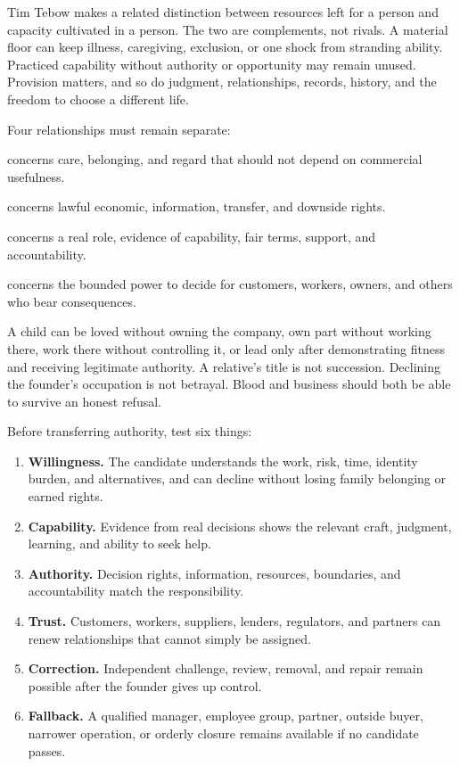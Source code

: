 Tim Tebow makes a related distinction between resources left for a person and
capacity cultivated in a person. The two are complements, not rivals. A
material floor can keep illness, caregiving, exclusion, or one shock from
stranding ability. Practiced capability without authority or opportunity may
remain unused. Provision matters, and so do judgment, relationships, records,
history, and the freedom to choose a different life.

Four relationships must remain separate:

\begin{description}[leftmargin=0em,style=unboxed,itemsep=0.1em,
  topsep=0.2em,parsep=0em,labelsep=0.55em]
\item[Kinship] concerns care, belonging, and regard that should not depend on
  commercial usefulness.
\item[Ownership] concerns lawful economic, information, transfer, and downside
  rights.
\item[Employment] concerns a real role, evidence of capability, fair terms,
  support, and accountability.
\item[Authority] concerns the bounded power to decide for customers, workers,
  owners, and others who bear consequences.
\end{description}

A child can be loved without owning the company, own part without working
there, work there without controlling it, or lead only after demonstrating
fitness and receiving legitimate authority. A relative's title is not
succession. Declining the founder's occupation is not betrayal. Blood and
business should both be able to survive an honest refusal.

Before transferring authority, test six things:

\enlargethispage{2\baselineskip}

\begin{enumerate}[itemsep=0.12em]
\item \textbf{Willingness.} The candidate understands the work, risk, time,
  identity burden, and alternatives, and can decline without losing family
  belonging or earned rights.
\item \textbf{Capability.} Evidence from real decisions shows the relevant
  craft, judgment, learning, and ability to seek help.
\item \textbf{Authority.} Decision rights, information, resources, boundaries,
  and accountability match the responsibility.
\item \textbf{Trust.} Customers, workers, suppliers, lenders, regulators, and
  partners can renew relationships that cannot simply be assigned.
\item \textbf{Correction.} Independent challenge, review, removal, and repair
  remain possible after the founder gives up control.
\item \textbf{Fallback.} A qualified manager, employee group, partner, outside
  buyer, narrower operation, or orderly closure remains available if no
  candidate passes.
\end{enumerate}

